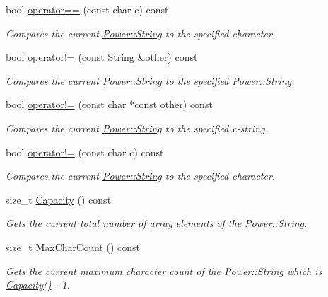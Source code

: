 \begin{DoxyCompactItemize}
bool \hyperlink{class_power_1_1_string_a9a5cf72ccd272199f2eeb4baeaf7789f}{operator==} (const char c) const
\begin{DoxyCompactList}\small\item\em Compares the current \hyperlink{class_power_1_1_string}{Power\+::\+String} to the specified character. \end{DoxyCompactList}\item 
bool \hyperlink{class_power_1_1_string_a554a6ff1a319237b53d978ed3ef18f07}{operator!=} (const \hyperlink{class_power_1_1_string}{String} \&other) const
\begin{DoxyCompactList}\small\item\em Compares the current \hyperlink{class_power_1_1_string}{Power\+::\+String} to the specified \hyperlink{class_power_1_1_string}{Power\+::\+String}. \end{DoxyCompactList}\item 
bool \hyperlink{class_power_1_1_string_a267b8f261bcafb9ec6d86cfe12494c94}{operator!=} (const char $\ast$const other) const
\begin{DoxyCompactList}\small\item\em Compares the current \hyperlink{class_power_1_1_string}{Power\+::\+String} to the specified c-\/string. \end{DoxyCompactList}\item 
bool \hyperlink{class_power_1_1_string_a3216ffa5d292b08997d1c93d3c33251e}{operator!=} (const char c) const
\begin{DoxyCompactList}\small\item\em Compares the current \hyperlink{class_power_1_1_string}{Power\+::\+String} to the specified character. \end{DoxyCompactList}\item 
size\+\_\+t \hyperlink{class_power_1_1_string_aa25a140140cd4fe69b04d70a794c8394}{Capacity} () const
\begin{DoxyCompactList}\small\item\em Gets the current total number of array elements of the \hyperlink{class_power_1_1_string}{Power\+::\+String}. \end{DoxyCompactList}\item 
size\+\_\+t \hyperlink{class_power_1_1_string_a7ddd69137de1b2bbdbc958d8a6075bbf}{Max\+Char\+Count} () const
\begin{DoxyCompactList}\small\item\em Gets the current maximum character count of the \hyperlink{class_power_1_1_string}{Power\+::\+String} which is \hyperlink{class_power_1_1_string_aa25a140140cd4fe69b04d70a794c8394}{Capacity()} -\/ 1. \end{DoxyCompactList}\item 

\end{DoxyCompactItemize}
